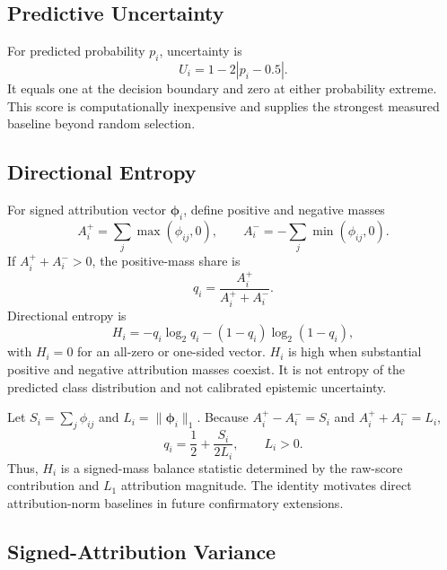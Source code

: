 \subsection{Predictive Uncertainty}

For predicted probability $p_i$, uncertainty is
\begin{equation}
U_i=1-2|p_i-0.5|.
\label{eq:uncertainty}
\end{equation}
It equals one at the decision boundary and zero at either probability extreme.
This score is computationally inexpensive and supplies the strongest measured
baseline beyond random selection.

\subsection{Directional Entropy}

For signed attribution vector $\boldsymbol{\phi}_i$, define positive and
negative masses
\begin{equation}
A_i^+=\sum_j\max(\phi_{ij},0),\qquad
A_i^-=-\sum_j\min(\phi_{ij},0).
\end{equation}
If $A_i^++A_i^->0$, the positive-mass share is
\begin{equation}
q_i=\frac{A_i^+}{A_i^++A_i^-}.
\end{equation}
Directional entropy is
\begin{equation}
H_i=-q_i\log_2q_i-(1-q_i)\log_2(1-q_i),
\label{eq:entropy}
\end{equation}
with $H_i=0$ for an all-zero or one-sided vector. $H_i$ is high when substantial
positive and negative attribution masses coexist. It is not entropy of the
predicted class distribution and not calibrated epistemic uncertainty.

Let $S_i=\sum_j\phi_{ij}$ and $L_i=\|\boldsymbol{\phi}_i\|_1$. Because
$A_i^+-A_i^-=S_i$ and $A_i^++A_i^-=L_i$,
\begin{equation}
q_i=\frac{1}{2}+\frac{S_i}{2L_i},\qquad L_i>0.
\label{eq:h-identity}
\end{equation}
Thus, $H_i$ is a signed-mass balance statistic determined by the raw-score
contribution and $L_1$ attribution magnitude. The identity motivates direct
attribution-norm baselines in future confirmatory extensions.

\subsection{Signed-Attribution Variance}

